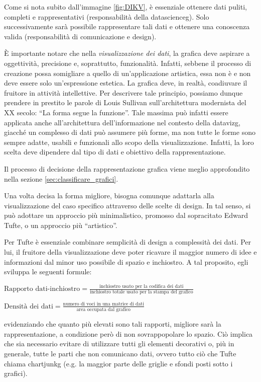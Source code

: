 Come si nota subito dall'immagine \ref{fig:DIKV}, è essenziale ottenere dati puliti, completi e rappresentativi (responsabilità della \gls{datascienceg}). Solo successivamente sarà possibile rappresentare tali dati e 
ottenere una conoscenza valida (responsabilità di comunicazione e design).

\bigskip
\noindent È importante notare che nella \emph{visualizzazione dei dati}, la grafica deve aspirare a oggettività, precisione e, soprattutto, funzionalità. Infatti, sebbene il processo di creazione possa somigliare 
a quello di un'applicazione artistica, essa non è e non deve essere solo un'espressione estetica. La grafica deve, in realtà, coadiuvare il fruitore in attività intellettive.
Per descrivere tale principio, possiamo dunque prendere in prestito le parole di Louis Sullivan sull'architettura modernista del XX secolo: ``La forma segue la funzione''. 
Tale massima può infatti essere applicata anche all'architettura dell'informazione nel contesto della \gls{datavizg}, giacché
un complesso di dati può assumere più forme, ma non tutte le forme sono sempre adatte, usabili e funzionali allo scopo della visualizzazione. Infatti, la loro scelta deve dipendere dal
tipo di dati e obiettivo della rappresentazione.

Il processo di decisione della rappresentazione grafica viene meglio approfondito nella sezione \ref{sec:classificare_grafici}.

\bigskip
\noindent Una volta decisa la forma migliore, bisogna comunque adattarla alla visualizzazione del caso specifico attraverso delle scelte di design.
In tal senso, si può adottare un approccio più minimalistico, promosso dal sopracitato Edward Tufte, o un approccio più ``artistico''.

Per Tufte è essenziale combinare semplicità di design a complessità dei dati. Per lui, il fruitore della visualizzazione deve poter ricavare il maggior numero di idee e informazioni dal minor uso possibile di spazio e inchiostro.
A tal proposito, egli sviluppa le seguenti formule: 
\begin{center}
    $\text{Rapporto dati-inchiostro} = \frac{\text{inchiostro usato per la codifica dei dati}}{\text{inchiostro totale usato per la stampa del grafico}}$
\end{center}
\begin{center}
    $\text{Densità dei dati} = \frac{\text{numero di voci in una matrice di dati}}{\text{area occupata dal grafico}}$
\end{center}
evidenziando che quanto più elevati sono tali rapporti, migliore sarà la rappresentazione, a condizione però di non sovrappopolare lo spazio.
Ciò implica che sia necessario evitare di utilizzare tutti gli elementi decorativi o, più in generale, tutte le parti che non comunicano
dati, ovvero tutto ciò che Tufte chiama \gls{chartjunkg} (e.g. la maggior parte delle griglie e sfondi posti sotto i grafici).

